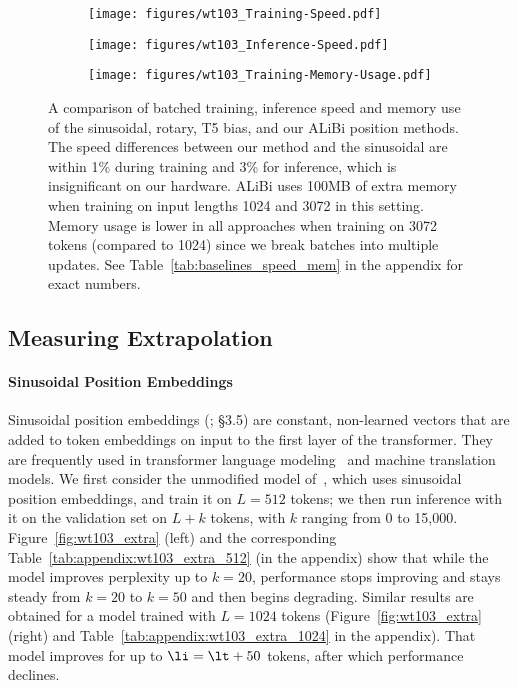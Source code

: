 \begin{figure}
\centering
\begin{subfigure}{.28\textwidth}
  \centering
  \texttt{[image: figures/wt103\_Training-Speed.pdf]}
\end{subfigure}%
\begin{subfigure}{.28\textwidth}
  \centering
  \texttt{[image: figures/wt103\_Inference-Speed.pdf]}
\end{subfigure}
\begin{subfigure}{.28\textwidth}
  \centering
  \texttt{[image: figures/wt103\_Training-Memory-Usage.pdf]}
\end{subfigure}
\begin{subfigure}[]{.14\textwidth}
\centering
{}
\end{subfigure}
\caption{A comparison of batched training, inference speed and memory use of the sinusoidal, rotary, T5 bias, and our ALiBi position methods. The speed differences between our method and the sinusoidal are within 1\% during training and 3\% for inference, which is insignificant on our hardware. ALiBi uses 100MB of extra memory when training on input lengths 1024 and 3072 in this setting. Memory usage is lower in all approaches when training on 3072 tokens (compared to 1024) since we break batches into multiple updates. See Table~\ref{tab:baselines_speed_mem} in the appendix for exact numbers. 
}
\label{fig:wt103_speed_mem}
\end{figure}

\subsection{Measuring Extrapolation}
\paragraph{Sinusoidal Position Embeddings}
Sinusoidal position embeddings (\citealp{vaswani}; \S 3.5) are constant, non-learned vectors that are added to token embeddings on input to the first layer of the transformer. They are frequently used in transformer language modeling~\citep{baevski,lewis2021base} and machine translation~\citep{vaswani,ott2018scaling} models. 
We first consider the unmodified model of~\cite{baevski}, which uses sinusoidal position embeddings, and train it on $L=512$ tokens; we then run inference with it on the validation set on $L+k$ tokens, with $k$ ranging from 0 to 15,000.
Figure~\ref{fig:wt103_extra} (left) and the corresponding Table~\ref{tab:appendix:wt103_extra_512} (in the appendix) show that while the model improves  perplexity up to $k=20$, performance stops improving and stays steady from $k=20$ to $k=50$ and then begins degrading. 
Similar results are obtained for a model trained with $L=1024$ tokens (Figure~\ref{fig:wt103_extra} (right) and Table~\ref{tab:appendix:wt103_extra_1024} in the appendix). That model improves for up to $\li = \lt + 50$ tokens, after which performance declines. 

